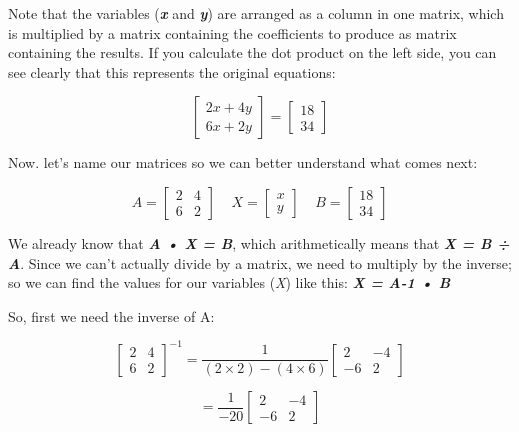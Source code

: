 \documentclass[11pt]{article}
\begin{document}
Note that the variables (\textbf{\emph{x}} and \textbf{\emph{y}}) are
arranged as a column in one matrix, which is multiplied by a matrix
containing the coefficients to produce as matrix containing the results.
If you calculate the dot product on the left side, you can see clearly
that this represents the original equations:

\begin{equation}\begin{bmatrix}2x + 4y\\6x + 2y\end{bmatrix} =\begin{bmatrix}18\\34\end{bmatrix}\end{equation}

Now. let's name our matrices so we can better understand what comes
next:

\begin{equation}A=\begin{bmatrix}2 & 4\\6 & 2\end{bmatrix}\;\;\;\;X=\begin{bmatrix}x\\y\end{bmatrix}\;\;\;\;B=\begin{bmatrix}18\\34\end{bmatrix}\end{equation}

We already know that \textbf{\emph{A • X = B}}, which arithmetically
means that \textbf{\emph{X = B ÷ A}}. Since we can't actually divide by
a matrix, we need to multiply by the inverse; so we can find the values
for our variables (\emph{X}) like this: \textbf{\emph{X = A-1 • B}}

So, first we need the inverse of A:

\begin{equation}\begin{bmatrix}2 & 4\\6 & 2\end{bmatrix}^{-1} = \frac{1}{(2\times2)-(4\times6)}  \begin{bmatrix}2 & -4\\-6 & 2\end{bmatrix}\end{equation}

\begin{equation}= \frac{1}{-20}  \begin{bmatrix}2 & -4\\-6 & 2\end{bmatrix}\end{equation}
\end{document}
